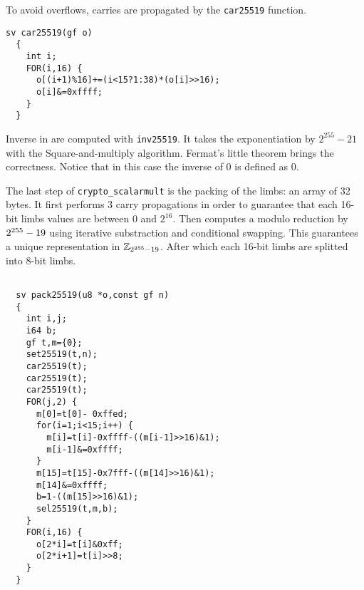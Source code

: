   To avoid overflows, carries are propagated by the \texttt{car25519} function.
  \begin{lstlisting}[language=Ctweetnacl]
  sv car25519(gf o)
  {
    int i;
    FOR(i,16) {
      o[(i+1)%16]+=(i<15?1:38)*(o[i]>>16);
      o[i]&=0xffff;
    }
  }
  \end{lstlisting}

  Inverse in \Zfield are computed with \texttt{inv25519}.
  It takes the exponentiation by $2^{255}-21$ with the Square-and-multiply algorithm.
  Fermat's little theorem brings the correctness.
  Notice that in this case the inverse of $0$ is defined as $0$.


  The last step of \texttt{crypto\_scalarmult} is the packing of the limbs: an array of 32 bytes.
  It first performs 3 carry propagations in order to guarantee
  that each 16-bit limbs values are between $0$ and $2^{16}$.
  Then computes a modulo reduction by $2^{255}-19$ using iterative substraction and
  conditional swapping. This guarantees a unique representation in $\mathbb{Z}_{2^{255}-19}$.
  After which each 16-bit limbs are splitted into 8-bit limbs.
  \begin{lstlisting}[language=Ctweetnacl]

  sv pack25519(u8 *o,const gf n)
  {
    int i,j;
    i64 b;
    gf t,m={0};
    set25519(t,n);
    car25519(t);
    car25519(t);
    car25519(t);
    FOR(j,2) {
      m[0]=t[0]- 0xffed;
      for(i=1;i<15;i++) {
        m[i]=t[i]-0xffff-((m[i-1]>>16)&1);
        m[i-1]&=0xffff;
      }
      m[15]=t[15]-0x7fff-((m[14]>>16)&1);
      m[14]&=0xffff;
      b=1-((m[15]>>16)&1);
      sel25519(t,m,b);
    }
    FOR(i,16) {
      o[2*i]=t[i]&0xff;
      o[2*i+1]=t[i]>>8;
    }
  }
  \end{lstlisting}

